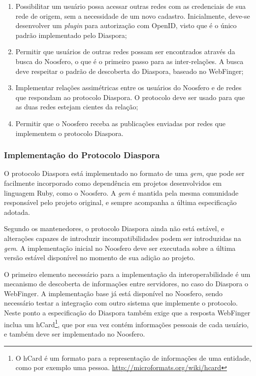 \begin{enumerate}
  \item{Possibilitar um usuário possa acessar outras redes com as credenciais de sua
        rede de origem, sem a necessidade de um novo cadastro. Inicialmente, deve-se
        desenvolver um \textit{plugin} para autorização com OpenID, visto que é o
        único padrão implementado pelo Diaspora;}

  \item{Permitir que usuários de outras redes possam ser encontrados através da
        busca do Noosfero, o que é o primeiro passo para as inter-relações. A busca
        deve respeitar o padrão de descoberta do Diaspora, baseado no WebFinger;}

  \item{Implementar relações assimétricas entre os usuários do Noosfero e de redes
        que respondam ao protocolo Diaspora. O protocolo deve ser usado para que as
        duas redes estejam cientes da relação;}

  \item{Permitir que o Noosfero receba as publicações enviadas por redes que
        implementem o protocolo Diaspora.}
\end{enumerate}

\subsubsection{Implementação do Protocolo Diaspora}

O protocolo Diaspora está implementado no formato de uma \textit{gem}, que pode ser
facilmente incorporado como dependência em projetos desenvolvidos em linguagem Ruby,
como o Noosfero. A \textit{gem} é mantida pela mesma comunidade responsável pelo
projeto original, e sempre acompanha a última especificação adotada.

Segundo os mantenedores, o protocolo Diaspora ainda não está estável, e alterações
capazes de introduzir incompatibilidades podem ser introduzidas na \textit{gem}. A
implementação inicial no Noosfero deve ser executada sobre a última versão estável
disponível no momento de sua adição ao projeto.

O primeiro elemento necessário para a implementação da interoperabilidade é um
mecanismo de descoberta de informações entre servidores, no caso do Diaspora o
WebFinger. A implementação base já está disponível no Noosfero, sendo necessário
testar a integração com outro sistema que implemente o protocolo. Neste ponto a
especificação do Diaspora também exige que a resposta WebFinger inclua um
hCard\footnote{O hCard é um formato para a representação de informações de uma
entidade, como por exemplo uma pessoa. \url{http://microformats.org/wiki/hcard}},
que por sua vez contém informações pessoais de cada usuário, e também deve ser
implementado no Noosfero.

